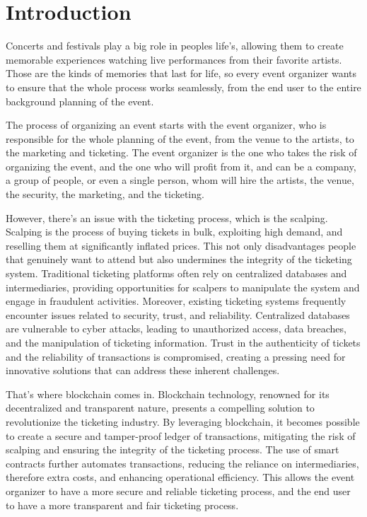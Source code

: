 \chapter{Introduction}

Concerts and festivals play a big role in peoples life's, allowing them to create memorable experiences watching live performances from their favorite artists. Those are the kinds of memories that last for life, so every event organizer wants to ensure that the whole process works seamlessly, from the end user to the entire background planning of the event.

The process of organizing an event starts with the event organizer, who is responsible for the whole planning of the event, from the venue to the artists, to the marketing and ticketing. The event organizer is the one who takes the risk of organizing the event, and the one who will profit from it, and can be a company, a group of people, or even a single person, whom will hire the artists, the venue, the security, the marketing, and the ticketing.

However, there's an issue with the ticketing process, which is the scalping. Scalping is the process of buying tickets in bulk, exploiting high demand, and reselling them at significantly inflated prices. This not only disadvantages people that genuinely want to attend but also undermines the integrity of the ticketing system. Traditional ticketing platforms often rely on centralized databases and intermediaries, providing opportunities for scalpers to manipulate the system and engage in fraudulent activities.
Moreover, existing ticketing systems frequently encounter issues related to security, trust, and reliability. Centralized databases are vulnerable to cyber attacks, leading to unauthorized access, data breaches, and the manipulation of ticketing information. Trust in the authenticity of tickets and the reliability of transactions is compromised, creating a pressing need for innovative solutions that can address these inherent challenges.

That's where blockchain comes in. Blockchain technology, renowned for its decentralized and transparent nature, presents a compelling solution to revolutionize the ticketing industry. By leveraging blockchain, it becomes possible to create a secure and tamper-proof ledger of transactions, mitigating the risk of scalping and ensuring the integrity of the ticketing process. The use of smart contracts further automates transactions, reducing the reliance on intermediaries, therefore extra costs, and enhancing operational efficiency. This allows the event organizer to have a more secure and reliable ticketing process, and the end user to have a more transparent and fair ticketing process.





